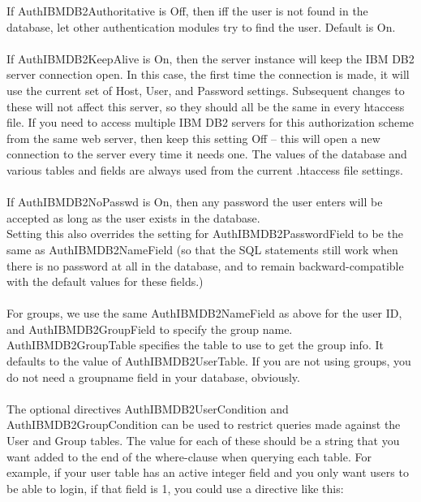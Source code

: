 \documentclass[11pt,letterpaper]{scrartcl}
\def\tt{\normalfont\ttfamily}
\begin{document}
\newpage
\noindent
If {\tt AuthIBMDB2Authoritative} is {\tt Off}, then iff the user is not found in the database, let other authentication modules try to find the user. Default is {\tt On}. \\
\\
If {\tt AuthIBMDB2KeepAlive} is {\tt On}, then the server instance will keep the IBM DB2 server connection open.  In this case, the first time the connection is made, it will use the current set of Host, User, and Password settings.  Subsequent changes to these will not affect this server, so they should all be the same in every htaccess file.
If you need to access multiple IBM DB2 servers for this authorization scheme from the same web server, then keep this setting {\tt Off} -- this will open a new connection to the server every time it needs one.  The values of the database and various tables and fields are always used from the current {\tt .htaccess} file settings.\\
\\
If {\tt AuthIBMDB2NoPasswd} is {\tt On}, then any password the user enters will be accepted as long as the user exists in the database.\\ Setting this also overrides the setting for {\tt AuthIBMDB2PasswordField} to be the same as {\tt AuthIBMDB2NameField} (so that the SQL statements still work when there is no password at all in the database, and to remain backward-compatible with the default values for these fields.)\\
\\
For groups, we use the same {\tt AuthIBMDB2NameField} as above for the user ID, and {\tt AuthIBMDB2GroupField} to specify the group name.\\ {\tt AuthIBMDB2GroupTable} specifies the table to use to get the group info.  It defaults to the value of {\tt AuthIBMDB2UserTable}.  If you are not using groups, you do not need a {\tt groupname} field in your database, obviously.\\
\\
The optional directives {\tt AuthIBMDB2UserCondition} and \\{\tt AuthIBMDB2GroupCondition} can be used to restrict queries made against the User and Group tables. The value for each of these should be a string that you want added to the end of the where-clause when querying each table.
For example, if your user table has an {\tt active} integer field and you only want users to be able to login, if that field is 1, you could use a directive like this:\\
\end{document}
